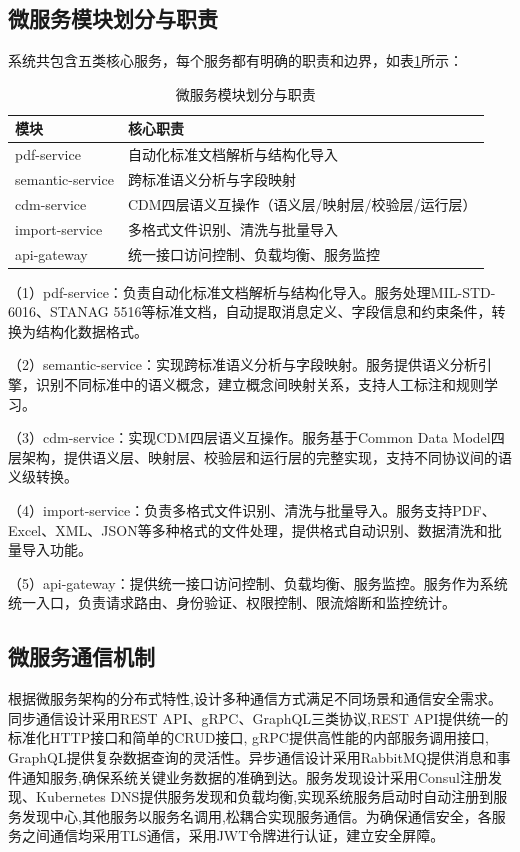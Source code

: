 \subsection{微服务模块划分与职责}

系统共包含五类核心服务，每个服务都有明确的职责和边界，如表\ref{table:microservices}所示：

\begin{table}[H]
    \caption{微服务模块划分与职责}
    \label{table:microservices}
    \centering
    \begin{tabular}{ll}
        \toprule
        \textbf{模块} & \textbf{核心职责} \\
        \midrule
        pdf-service & 自动化标准文档解析与结构化导入 \\
        semantic-service & 跨标准语义分析与字段映射 \\
        cdm-service & CDM四层语义互操作（语义层/映射层/校验层/运行层） \\
        import-service & 多格式文件识别、清洗与批量导入 \\
        api-gateway & 统一接口访问控制、负载均衡、服务监控 \\
        \bottomrule
    \end{tabular}
\end{table}

（1）pdf-service：负责自动化标准文档解析与结构化导入。服务处理MIL-STD-6016、STANAG 5516等标准文档，自动提取消息定义、字段信息和约束条件，转换为结构化数据格式。

（2）semantic-service：实现跨标准语义分析与字段映射。服务提供语义分析引擎，识别不同标准中的语义概念，建立概念间映射关系，支持人工标注和规则学习。

（3）cdm-service：实现CDM四层语义互操作。服务基于Common Data Model四层架构，提供语义层、映射层、校验层和运行层的完整实现，支持不同协议间的语义级转换。

（4）import-service：负责多格式文件识别、清洗与批量导入。服务支持PDF、Excel、XML、JSON等多种格式的文件处理，提供格式自动识别、数据清洗和批量导入功能。

（5）api-gateway：提供统一接口访问控制、负载均衡、服务监控。服务作为系统统一入口，负责请求路由、身份验证、权限控制、限流熔断和监控统计。

\subsection{微服务通信机制}

根据微服务架构的分布式特性,设计多种通信方式满足不同场景和通信安全需求。同步通信设计采用REST API、gRPC、GraphQL三类协议,REST API提供统一的标准化HTTP接口和简单的CRUD接口, gRPC提供高性能的内部服务调用接口, GraphQL提供复杂数据查询的灵活性。异步通信设计采用RabbitMQ提供消息和事件通知服务,确保系统关键业务数据的准确到达。服务发现设计采用Consul注册发现、Kubernetes DNS提供服务发现和负载均衡,实现系统服务启动时自动注册到服务发现中心,其他服务以服务名调用,松耦合实现服务通信。为确保通信安全，各服务之间通信均采用TLS通信，采用JWT令牌进行认证，建立安全屏障。

